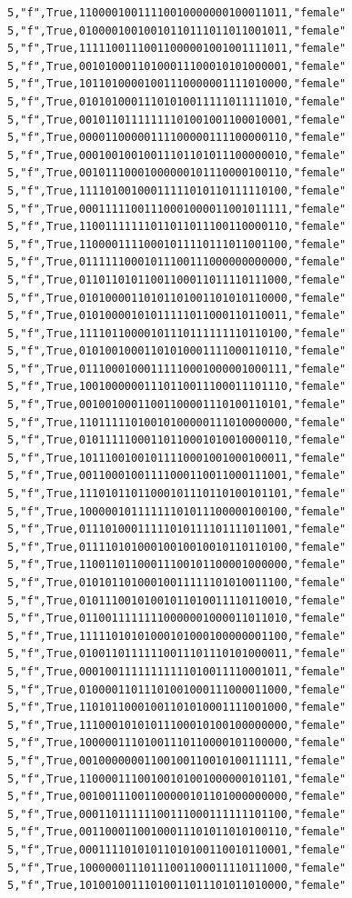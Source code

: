 \documentclass[authoryearcitations]{UoYCSproject}
\begin{document}
\begin{framed}
\begin{verbatim}
5,"f",True,11000010011110010000000100011011,"female"
5,"f",True,01000010010010110111011011001011,"female"
5,"f",True,11111001110011000001001001111011,"female"
5,"f",True,00101000110100011100010101000001,"female"
5,"f",True,10110100001001110000001111010000,"female"
5,"f",True,01010100011101010011111011111010,"female"
5,"f",True,00101101111111101001001100010001,"female"
5,"f",True,00001100000111100000111100000110,"female"
5,"f",True,00010010010011101101011100000010,"female"
5,"f",True,00101110001000000101110000100110,"female"
5,"f",True,11110100100011111010110111110100,"female"
5,"f",True,00011111001110001000011001011111,"female"
5,"f",True,11001111111011011011100110000110,"female"
5,"f",True,11000011110001011110111011001100,"female"
5,"f",True,01111110001011100111000000000000,"female"
5,"f",True,01101101011001100011011110111000,"female"
5,"f",True,01010000110101101001101010110000,"female"
5,"f",True,01010000101011111011000110110011,"female"
5,"f",True,11110110000101110111111110110100,"female"
5,"f",True,01010010001101010001111000110110,"female"
5,"f",True,01110001000111110001000001000111,"female"
5,"f",True,10010000001110110011100011101110,"female"
5,"f",True,00100100011001100001110100110101,"female"
5,"f",True,11011111010010100000111010000000,"female"
5,"f",True,01011111000110110001010010000110,"female"
5,"f",True,10111001001011110001001000100011,"female"
5,"f",True,00110001001111000110011000111001,"female"
5,"f",True,11101011011000101110110100101101,"female"
5,"f",True,10000010111111101011100000100100,"female"
5,"f",True,01110100011111010111101111011001,"female"
5,"f",True,01111010100010010010010110110100,"female"
5,"f",True,11001101100011100101100001000000,"female"
5,"f",True,01010110100010011111101010011100,"female"
5,"f",True,01011100101001011010011110110010,"female"
5,"f",True,01100111111110000001000011011010,"female"
5,"f",True,11111010101000101000100000001100,"female"
5,"f",True,01001101111110011101110101000011,"female"
5,"f",True,00010011111111111010011110001011,"female"
5,"f",True,01000011011101001000111000011000,"female"
5,"f",True,11010110001001101010001111001000,"female"
5,"f",True,11100010101011100010100100000000,"female"
5,"f",True,10000011101001110110000101100000,"female"
5,"f",True,00100000001100100110010100111111,"female"
5,"f",True,11000011100100101001000000101101,"female"
5,"f",True,00100111001100000101101000000000,"female"
5,"f",True,00011011111100111000111111101100,"female"
5,"f",True,00110001100100011101011010100110,"female"
5,"f",True,00011110101011010100110010110001,"female"
5,"f",True,10000001110111001100011110111000,"female"
5,"f",True,10100100111010011011101011010000,"female"

\end{verbatim}
\end{framed}
\end{document}
